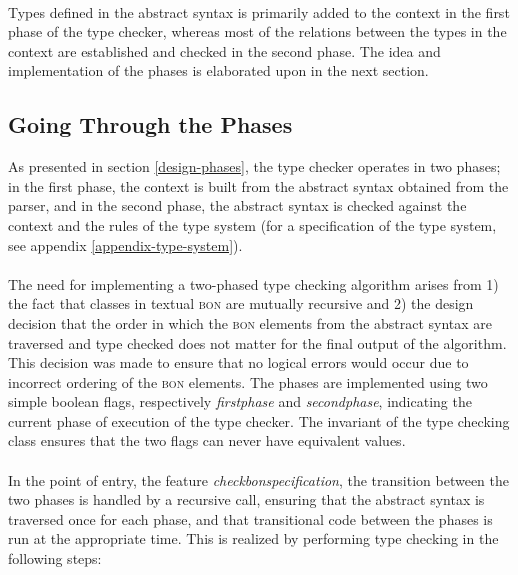 \paragraph{}
Types defined in the abstract syntax is primarily added to the context in the first phase of the type checker, whereas most of the relations between the types in the context are established and checked in the second phase. The idea and implementation of the phases is elaborated upon in the next section.

\subsection{Going Through the Phases}
As presented in section \ref{design-phases}, the type checker operates in two phases; in the first phase, the context is built from the abstract syntax obtained from the parser, and in the second phase, the abstract syntax is checked against the context and the rules of the type system (for a specification of the type system, see appendix \ref{appendix-type-system}).
\paragraph{} %
The need for implementing a two-phased type checking algorithm arises from 1) the fact that classes in textual \textsc{bon} are mutually recursive and 2) the design decision that the order in which the \textsc{bon} elements from the abstract syntax are traversed and type checked does not matter for the final output of the algorithm. This decision was made to ensure that no logical errors would occur due to incorrect ordering of the \textsc{bon} elements.
The phases are implemented using two simple boolean flags, respectively \textit{first\textunderscore phase} and \textit{second\textunderscore phase}, indicating the current phase of execution of the type checker. The invariant of the type checking class ensures that the two flags can never have equivalent values.

\paragraph{}
In the point of entry, the feature \textit{check\textunderscore bon\textunderscore specification}, the transition between the two phases is handled by a recursive call, ensuring that the abstract syntax is traversed once for each phase, and that transitional code between the phases is run at the appropriate time. This is realized by performing type checking in the following steps:

